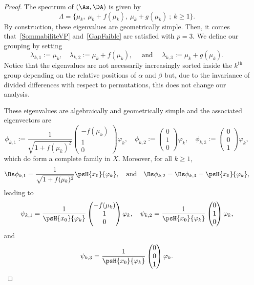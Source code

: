 \begin{proof}
The spectrum of $(\As, \DA)$ is given by
\[
\Lambda = \{ \mu_k, \: \mu_k + f(\mu_k), \: \mu_k+g(\mu_k) \: ; \: k \geq 1\}.
\]
By construction, these eigenvalues are geometrically simple. Then, it comes that~\eqref{SommabiliteVP} and~\eqref{GapFaible} are satisfied with $p=3$. We define our grouping by setting
\[
\lambda_{k,1}:=\mu_k, \quad \lambda_{k,2}:=\mu_k+f(\mu_k), \quad \text{ and } \quad \lambda_{k,3} := \mu_k + g(\mu_k).
\]
Notice that the eigenvalues are not necessarily increasingly sorted inside the $k^{\text{th}}$ group depending on the relative positions of $\alpha$ and $\beta$ but, due to the invariance of divided differences with respect to permutations, this does not change our analysis.

These eigenvalues are algebraically and geometrically simple and the associated eigenvectors are
\[
\phi_{k,1} := \frac{1}{\sqrt{1+f(\mu_k)^2}}
\begin{pmatrix} -f(\mu_k) \\1\\0
\end{pmatrix} \varphi_k, \quad
\phi_{k,2} :=
\begin{pmatrix} 0\\1\\0
\end{pmatrix} \varphi_k, \quad
\phi_{k,3} :=
\begin{pmatrix} 0\\0\\1
\end{pmatrix} \varphi_k,
\]
which do form a complete family in $X$. Moreover, for all $k \geq 1$,
\[
\Bs \phi_{k,1}= \frac{1}{\sqrt{1+f(\mu_k)^2}} \psH{x_0}{\varphi_k},
\quad \text{and} \quad
\Bs \phi_{k,2}= \Bs \phi_{k,3} = \psH{x_0}{\varphi_k},
\]
leading to
\[
\psi_{k,1} = \frac{1}{\psH{x_0}{\varphi_k}}
\begin{pmatrix}
-f(\mu_k) \\1\\0
\end{pmatrix} \varphi_k,
\quad
\psi_{k,2} = \frac{1}{\psH{x_0}{\varphi_k}}
\begin{pmatrix}
0\\1\\0
\end{pmatrix} \varphi_k,
\]
and
\[
\psi_{k,3} = \frac{1}{\psH{x_0}{\varphi_k}}
\begin{pmatrix}
0\\0\\1
\end{pmatrix} \varphi_k.
\]
\end{proof}
